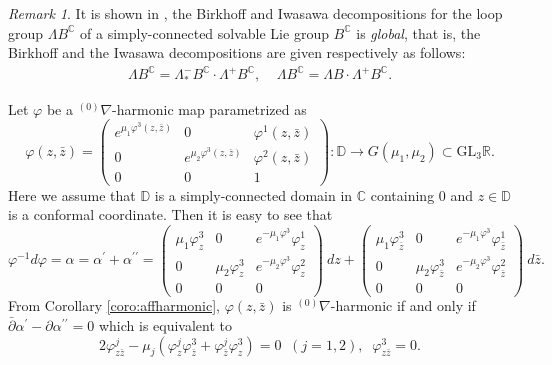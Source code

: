 \documentclass[12pt]{amsart}
\theoremstyle{definition}
\theoremstyle{remark}
\newtheorem{Remark}[Theorem]{Remark}
\numberwithin{equation}{section}
\begin{document}
\begin{Remark}
 It is shown in \cite[Lemma 4.3 and Lemma 6.4]{BD1},
 the Birkhoff and Iwasawa decompositions for the loop group $\Lambda B^{\mathbb C}$ 
 of a simply-connected solvable Lie group $B^{\mathbb C}$ is {\it global}, 
 that is, the Birkhoff and the Iwasawa decompositions are given respectively as follows:
\begin{align*}
 \Lambda B^{\mathbb C} = \Lambda^{-}_* B^{\mathbb C} \cdot \Lambda^+ B^{\mathbb C},\;\;\;\;
 \Lambda B^{\mathbb C} = \Lambda B \cdot \Lambda^+ B^{\mathbb C}.
\end{align*}
\end{Remark}
 Let $\varphi$ be a ${{}^{(0)}\nabla}$-harmonic map parametrized as 
\begin{equation*}
 \varphi (z, \bar z) = 
 \begin{pmatrix}
  e^{\mu_1 \varphi^3(z, \bar z)} & 0 &\varphi^1(z, \bar z) \\
  0 & e^{\mu_2 \varphi^3(z, \bar z)} &\varphi^2(z, \bar z) \\
  0 & 0 & 1
 \end{pmatrix} : \mathbb D \to G(\mu_1, \mu_2) \subset \mathrm{GL}_3 \mathbb R.
\end{equation*}
 Here we assume that $\mathbb D$ is a simply-connected domain in $\mathbb C$ containing
 $0$ and $z \in \mathbb D$ is a conformal coordinate.
 Then it is easy to see that  
 \begin{equation}\label{eq:MCvarphi}
 \varphi^{-1} d \varphi = \alpha = \alpha^{\prime} + \alpha^{\prime \prime}
 = \begin{pmatrix}
  \mu_1 \varphi^3_z & 0 & e^{-\mu_1 \varphi^3} \varphi^1_z \\
  0 & \mu_2 \varphi^3_z & e^{-\mu_2 \varphi^3} \varphi^2_z \\
  0 & 0 & 0 
 \end{pmatrix} \> dz 
+ 
 \begin{pmatrix}
  \mu_1 \varphi^3_{\bar z} & 0 & e^{-\mu_1 \varphi^3} \varphi^1_{\bar z} \\
  0 & \mu_2 \varphi^3_{\bar z} & e^{-\mu_2 \varphi^3} \varphi^2_{\bar z} \\
  0 & 0 & 0 
 \end{pmatrix} \> d{\bar z}.
\end{equation}
 From Corollary \ref{coro:affharmonic}, $\varphi(z, \bar z)$ is ${{}^{(0)}\nabla}$-harmonic if and only if $\bar \partial \alpha^{\prime} - \partial \alpha^{\prime \prime}=0$ which is 
 equivalent to 
\begin{equation*}
 2 \varphi^j_{z \bar z} - \mu_j (\varphi^j_z \varphi^{3}_{\bar z} 
 + \varphi^j_{\bar z} \varphi^3_z) =0 \;\;(j = 1, 2),\;\;
 \varphi^3_{z \bar z} =0.
\end{equation*}
\end{document}
